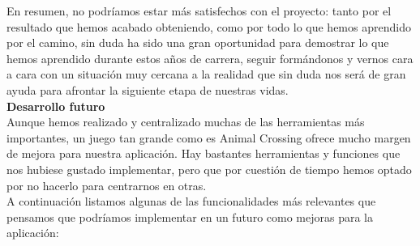 En resumen, no podríamos estar más satisfechos con el proyecto: tanto por el resultado que hemos acabado obteniendo, como por todo lo que hemos aprendido por el camino, sin duda ha sido una gran oportunidad para demostrar lo que hemos aprendido durante estos años de carrera, seguir formándonos y vernos cara a cara con un situación muy cercana a la realidad que sin duda nos será de gran ayuda para afrontar la siguiente etapa de nuestras vidas.\\

\textbf{\large Desarrollo futuro}\\

Aunque hemos realizado y centralizado muchas de las herramientas más importantes, un juego tan grande como es Animal Crossing ofrece mucho margen de mejora para nuestra aplicación. Hay bastantes herramientas y funciones que nos hubiese gustado implementar, pero que por cuestión de tiempo hemos optado por no hacerlo para centrarnos en otras.\\

A continuación listamos algunas de las funcionalidades más relevantes que pensamos que podríamos implementar en un futuro como mejoras para la aplicación:

